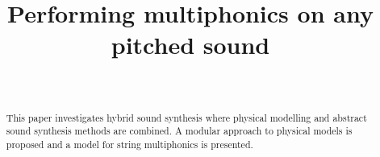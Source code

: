 \documentclass{sigchi}
\def\plaintitle{Performing multiphonics on any pitched sound}
\begin{document}
\title{\plaintitle}

\author{%
  \\
}

\maketitle


\begin{abstract}
This paper investigates hybrid sound synthesis where physical modelling and abstract sound synthesis methods are combined. A modular approach to physical models is proposed and a model for string multiphonics is presented.
\end{abstract}



\end{document}
